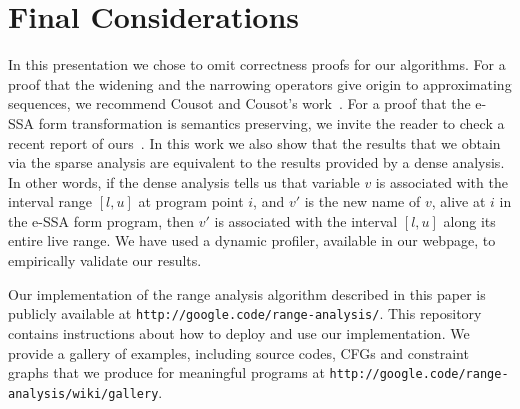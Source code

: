 \documentclass{llncs}
\begin{document}

\section{Final Considerations}
\label{sec:con}

In this presentation we chose to omit correctness proofs for our algorithms.
For a proof that the widening and the narrowing operators give origin to
approximating sequences, we recommend Cousot and Cousot's work~\cite{Cousot77}.
For a proof that the e-SSA form transformation is semantics preserving, we
invite the reader to check a recent report of ours~\cite{Tavares11b}.
In this work we also show that the results that we obtain via the
sparse analysis are equivalent to the results provided by a dense analysis.
In other words, if the dense analysis tells us that variable $v$ is
associated with the interval range $[l, u]$ at program point $i$, and $v'$
is the new name of $v$, alive at $i$ in the e-SSA form program, then $v'$ is
associated with the interval $[l, u]$ along its entire live range.
We have used a dynamic profiler, available in our webpage, to empirically
validate our results.

Our implementation of the range analysis algorithm described in this paper is
publicly available at \texttt{http://google.code/range-analysis/}.
This repository contains instructions about how to deploy and use our
implementation.
We provide a gallery of examples, including source codes,
CFGs and constraint graphs that we produce for meaningful programs at
\texttt{http://google.code/range-analysis/wiki/gallery}.



\end{document}
